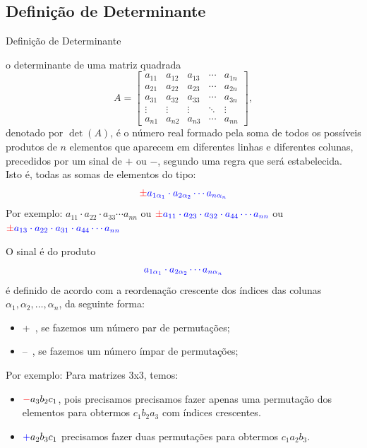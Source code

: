 \subsection*{Definição de Determinante}
\begin{frame}[label=determinantes]{Definição de Determinante}


o {\color{blue}determinante} de uma matriz quadrada
\[
A=\begin{bmatrix}
a_{11} & a_{12} &  a_{13} &  \cdots & a_{1n}\\
a_{21} & a_{22} &  a_{23} &  \cdots & a_{2n}\\
a_{31} & a_{32} &  a_{33} &  \cdots & a_{3n}\\
\vdots & \vdots & \vdots & \ddots & \vdots\\
a_{n1} & a_{n2} &  a_{n3} & \cdots & a_{nn}
\end{bmatrix},
\]
denotado por {\color{blue} $\det(A)$},  é o número real formado pela {\color{blue} soma de todos os possíveis produtos de \(n\) elementos que aparecem em diferentes linhas e diferentes colunas},
{\color{red}precedidos por um sinal de \(+\) ou \(-\)}, segundo uma regra que será estabelecida. Isto é, todas as somas de elementos do tipo:
\[
{\color{red}\pm} {\color{blue}a_{1\alpha_1}\cdot a_{2\alpha_2}\cdots a_{n\alpha_n}}
\]
Por exemplo: {\color{blue}\(a_{11}\cdot a_{22}\cdot a_{33}\cdots a_{nn}\)} ou 
\({\color{red}\pm} {\color{blue}a_{11}\cdot a_{23}\cdot a_{32}\cdot a_{44}\cdots a_{nn}}\) ou 
\({\color{red}\pm}{\color{blue}a_{13}\cdot a_{22}\cdot a_{31}\cdot a_{44}\cdots a_{nn}} \)
\end{frame}


\begin{frame}[label=determinantes]{}
O sinal é do produto 
\[
 {\color{blue}a_{1\alpha_1}\cdot a_{2\alpha_2}\cdots a_{n\alpha_n}}
\]
é definido de acordo com a {\color{blue}reordenação crescente} dos índices das colunas \(\alpha_1, \alpha_2, \ldots , \alpha_n\), da seguinte forma:
\begin{itemize}
\item {\color{blue}+}\ , se fazemos um número {\color{blue}par} de permutações;
\item {\color{red}--}\ , se  fazemos um número {\color{red}ímpar} de permutações;
\end{itemize}

Por exemplo: Para matrizes 3x3, temos:
\begin{itemize}
\item \({\color{red}-}a_3b_2c_1\), pois precisamos precisamos fazer {\color{red}apenas uma} permutação dos elementos para obtermos \(c_1b_2a_3\) com índices crescentes.

\item \({\color{blue}+}a_2b_3c_1\) precisamos fazer {\color{blue}duas} permutações para obtermos \(c_1a_2b_3\).
\end{itemize}
\end{frame}


